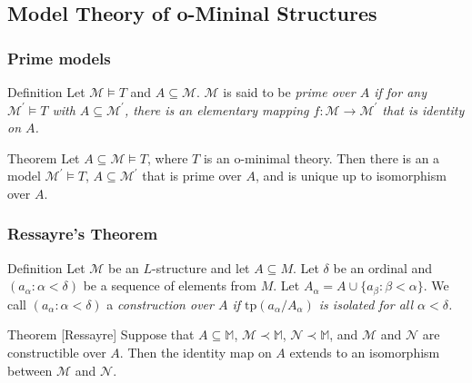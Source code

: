 \subsection{Model Theory of o-Mininal Structures}

\begin{frame}[c]\frametitle{Prime models}
    
	\begin{beamerboxesrounded}[shadow=true]{Definition}
		Let $\mathcal{M}\vDash T$  and $A\subseteq \mathcal{M}$.
		$\mathcal{M}$ is said to be \em prime over $A$ \em if for any $\mathcal{M^{\prime}} \vDash T$ with
		$A \subseteq \mathcal{M^{\prime}}$, there is an elementary mapping $f:\mathcal{M} \to \mathcal{M^{\prime}}$ that is identity on $A$.
 	\end{beamerboxesrounded}

 	\begin{beamerboxesrounded}[shadow=true]{Theorem}
 		Let $A \subseteq \mathcal{M} \vDash T$, where $T$ is an o-minimal theory.
 		Then there is an a model $\mathcal{M^{\prime}} \vDash T$, $A \subseteq \mathcal{M^{\prime}}$
 		that is prime over $A$, and is unique up to isomorphism over $A$.
 	\end{beamerboxesrounded}

\end{frame}

\begin{frame}[c]\frametitle{Ressayre's Theorem}
    
	\begin{beamerboxesrounded}[shadow=true]{Definition}
		Let $\mathcal{M}$ be an $L$-structure and let $A\subseteq M$.
		Let $\delta$ be an ordinal and \break $(a_\alpha : \alpha < \delta)$ be a sequence of elements from $M$.
		Let $A_\alpha = A \cup \{a_\beta : \beta < \alpha \}$. 
		We call $(a_\alpha : \alpha < \delta)$ a \em construction \em over $A$ if $\text{tp}(a_\alpha / A_\alpha)$ is isolated for all $\alpha < \delta$.
	\end{beamerboxesrounded}

	\begin{beamerboxesrounded}[shadow=true]{Theorem [Ressayre]}
		Suppose that $A \subseteq \mathbb{M}$, $\mathcal{M}\prec \mathbb{M}$, $\mathcal{N}\prec \mathbb{M}$, and $\mathcal{M}$ and $\mathcal{N}$ are constructible over $A$.
		Then the identity map on $A$ extends to an isomorphism between $\mathcal{M}$ and $\mathcal{N}$.
	\end{beamerboxesrounded}

\end{frame}

